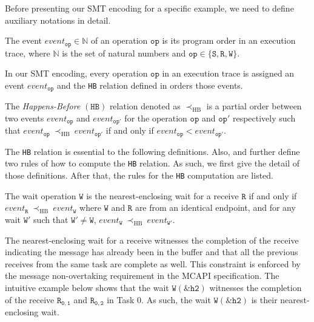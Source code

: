 Before presenting our SMT encoding for a specific example, we need to define auxiliary notations in detail.
\begin{definition}
The event $event_{\mathtt{op}}\in\mathbb{N}$ of an operation $\mathtt{op}$ is its program order in an execution trace, where $\mathbb{N}$ is the set of natural numbers and $\mathtt{op}\in\{\mathtt{S}, \mathtt{R}, \mathtt{W}\}$.
\label{def:event}
\end{definition}
In our SMT encoding, every operation $\mathtt{op}$ in an execution trace is assigned an event $event_{\mathtt{op}}$ and the \texttt{HB} relation defined in  orders those events.
\begin{definition}
The \emph{Happens-Before} $(\mathtt{HB})$ relation denoted as $\mathrm{\prec_{HB}}$ is a partial order between two events $event_{\mathtt{op}}$ and $event_{\mathtt{op'}}$ for the operation $\mathtt{op}$ and $\mathtt{op'}$ respectively such that $event_{\mathtt{op}}\ \mathrm{\prec_{HB}}\ event_{\mathtt{op'}}$ if and only if $event_{\mathtt{op}} < event_{\mathtt{op'}}$.
\label{def:hb}
\end{definition}
The \texttt{HB} relation is essential to the following definitions. Also,  and  further define two rules of how to compute the \texttt{HB} relation. As such, we first give the detail of those definitions. After that, the rules for the \texttt{HB} computation are listed.
\begin{definition}
The wait operation $\mathtt{W}$ is the nearest-enclosing wait for a receive $\mathtt{R}$ if and only if $event_{\mathtt{R}}\ \mathrm{\prec_{HB}}\ event_{\mathtt{W}}$ where $\mathtt{W}$ and $\mathtt{R}$ are from an identical endpoint, and for any wait $\mathtt{W'}$ such that $\mathtt{W'} \neq \mathtt{W}$, $event_{\mathtt{W}}\ \mathrm{\prec_{HB}}\ event_{\mathtt{W'}}$.
\label{def:nw}
\end{definition}
The nearest-enclosing wait for a receive witnesses the completion of the receive indicating the message has already been in the buffer and that all the previous receives from the same task are complete as well. This constraint is enforced by the message non-overtaking requirement in the MCAPI specification. The intuitive example below shows that the wait $\mathtt{W{(\&h2)}}$ witnesses the completion of the receive $\mathtt{R_{0,1}}$ and $\mathtt{R_{0,2}}$ in Task 0. As such, the wait $\mathtt{W{(\&h2)}}$ is their nearest-enclosing wait.
